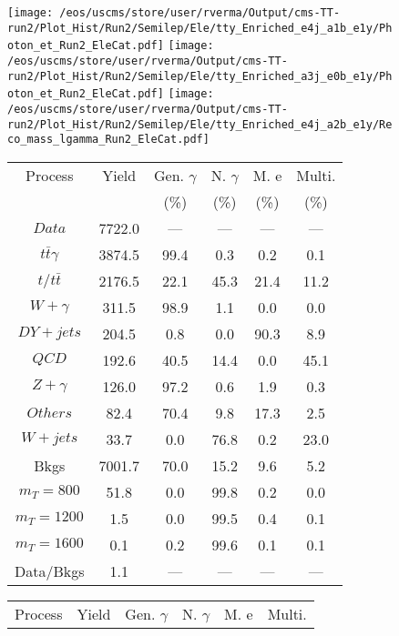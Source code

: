 \begin{figure}
\centering
\texttt{[image: /eos/uscms/store/user/rverma/Output/cms-TT-run2/Plot\_Hist/Run2/Semilep/Ele/tty\_Enriched\_e4j\_a1b\_e1y/Photon\_et\_Run2\_EleCat.pdf]}
\texttt{[image: /eos/uscms/store/user/rverma/Output/cms-TT-run2/Plot\_Hist/Run2/Semilep/Ele/tty\_Enriched\_a3j\_e0b\_e1y/Photon\_et\_Run2\_EleCat.pdf]}
\texttt{[image: /eos/uscms/store/user/rverma/Output/cms-TT-run2/Plot\_Hist/Run2/Semilep/Ele/tty\_Enriched\_e4j\_a2b\_e1y/Reco\_mass\_lgamma\_Run2\_EleCat.pdf]}
\begin{minipage}[c]{0.32\textwidth}
\centering
\tiny{
\begin{tabular}{cccccc}
\hline
Process & Yield & Gen. $\gamma$ & N. $\gamma$ & M. e & Multi. \\
 &  & (\%) & (\%) & (\%) & (\%)  \\
\hline
                                                                      $ Data $ &  7722.0 &  --- &  --- &  --- &  ---\\
$ t\bar{t}\gamma $ &  3874.5 &  99.4 &  0.3 &  0.2 &  0.1\\
$ t/t\bar{t} $ &  2176.5 &  22.1 &  45.3 &  21.4 &  11.2\\
$ W+\gamma $ &  311.5 &  98.9 &  1.1 &  0.0 &  0.0\\
$ DY+jets $ &  204.5 &  0.8 &  0.0 &  90.3 &  8.9\\
$ QCD $ &  192.6 &  40.5 &  14.4 &  0.0 &  45.1\\
$ Z+\gamma $ &  126.0 &  97.2 &  0.6 &  1.9 &  0.3\\
$ Others $ &  82.4 &  70.4 &  9.8 &  17.3 &  2.5\\
$ W+jets $ &  33.7 &  0.0 &  76.8 &  0.2 &  23.0\\
Bkgs &  7001.7 &  70.0 &  15.2 &  9.6 &  5.2\\
$ m_{T} = 800 $ &  51.8 &  0.0 &  99.8 &  0.2 &  0.0\\
$ m_{T} = 1200 $ &  1.5 &  0.0 &  99.5 &  0.4 &  0.1\\
$ m_{T} = 1600 $ &  0.1 &  0.2 &  99.6 &  0.1 &  0.1\\
Data/Bkgs &  1.1 &  --- &  --- &  --- &  ---\\
\hline
\end{tabular}
}
\end{minipage}
\begin{minipage}[c]{0.32\textwidth}
\centering
\tiny{
\begin{tabular}{cccccc}
\hline
Process & Yield & Gen. $\gamma$ & N. $\gamma$ & M. e & Multi. \\

\end{tabular}}
\end{minipage}
\end{figure}
